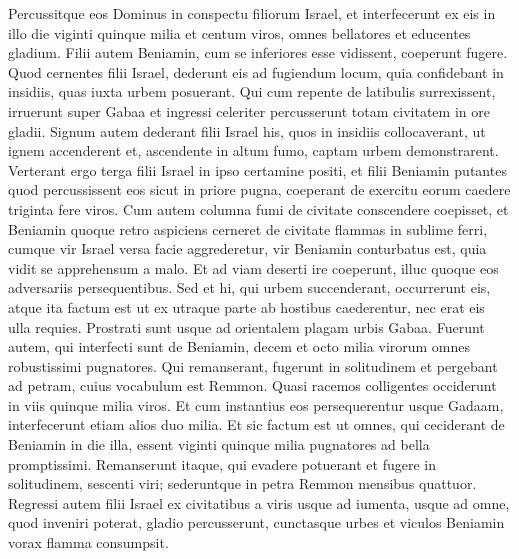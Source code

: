 \begin{biblechapter}
\begin{biblechapter}
\begin{biblechapter}
\begin{biblechapter}
\begin{biblechapter}
\begin{biblechapter}
\begin{biblechapter}
\begin{biblechapter}
\begin{biblechapter}
\begin{biblechapter}
\begin{biblechapter}
\begin{biblechapter}
\begin{biblechapter}
\begin{biblechapter}
\begin{biblechapter}
\begin{biblechapter}
\begin{biblechapter}
\begin{biblechapter}
\begin{biblechapter}
\begin{biblechapter}
\verse Percussitque eos Dominus in conspectu filiorum Israel, et interfecerunt ex eis in illo die viginti quinque milia et centum viros, omnes bellatores et educentes gladium.
 \verse Filii autem Beniamin, cum se inferiores esse vidissent, coeperunt fugere. Quod cernentes filii Israel, dederunt eis ad fugiendum locum, quia confidebant in insidiis, quas iuxta urbem posuerant. 
\verse Qui cum repente de latibulis surrexissent, irruerunt super Gabaa et ingressi celeriter percusserunt totam civitatem in ore gladii. 
\verse Signum autem dederant filii Israel his, quos in insidiis collocaverant, ut ignem accenderent et, ascendente in altum fumo, captam urbem demonstrarent. 
\verse Verterant ergo terga filii Israel in ipso certamine positi, et filii Beniamin putantes quod percussissent eos sicut in priore pugna, coeperant de exercitu eorum caedere triginta fere viros. 
\verse Cum autem columna fumi de civitate conscendere coepisset, et Beniamin quoque retro aspiciens cerneret de civitate flammas in sublime ferri, 
\verse cumque vir Israel versa facie aggrederetur, vir Beniamin conturbatus est, quia vidit se apprehensum a malo. 
\verse Et ad viam deserti ire coeperunt, illuc quoque eos adversariis persequentibus. Sed et hi, qui urbem succenderant, occurrerunt eis, 
\verse atque ita factum est ut ex utraque parte ab hostibus caederentur, nec erat eis ulla requies. Prostrati sunt usque ad orientalem plagam urbis Gabaa. 
 \verse Fuerunt autem, qui interfecti sunt de Beniamin, decem et octo milia virorum omnes robustissimi pugnatores. 
\verse Qui remanserant, fugerunt in solitudinem et pergebant ad petram, cuius vocabulum est Remmon. Quasi racemos colligentes occiderunt in viis quinque milia viros. Et cum instantius eos persequerentur usque Gadaam, interfecerunt etiam alios duo milia. 
\verse Et sic factum est ut omnes, qui ceciderant de Beniamin in die illa, essent viginti quinque milia pugnatores ad bella promptissimi. 
\verse Remanserunt itaque, qui evadere potuerant et fugere in solitudinem, sescenti viri; sederuntque in petra Remmon mensibus quattuor. 
\verse Regressi autem filii Israel ex civitatibus a viris usque ad iumenta, usque ad omne, quod inveniri poterat, gladio percusserunt, cunctasque urbes et viculos Beniamin vorax flamma consumpsit.
 

\end{biblechapter}
\end{biblechapter}
\end{biblechapter}
\end{biblechapter}
\end{biblechapter}
\end{biblechapter}
\end{biblechapter}
\end{biblechapter}
\end{biblechapter}
\end{biblechapter}
\end{biblechapter}
\end{biblechapter}
\end{biblechapter}
\end{biblechapter}
\end{biblechapter}
\end{biblechapter}
\end{biblechapter}
\end{biblechapter}
\end{biblechapter}
\end{biblechapter}
